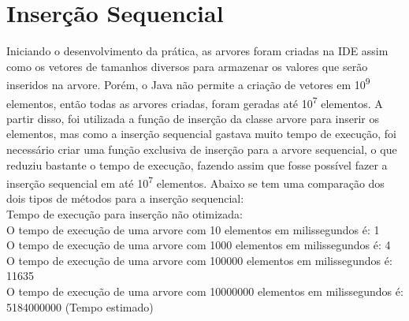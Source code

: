 \label{desenvolvimento}
\section{Inserção Sequencial}
    Iniciando o desenvolvimento da prática, as arvores foram criadas na IDE assim como os vetores de tamanhos diversos para armazenar os valores que serão inseridos na arvore. Porém, o Java não permite a criação de vetores em 10\textsuperscript{9} elementos, então todas as arvores criadas, foram geradas até 10\textsuperscript{7} elementos. A partir disso, foi utilizada a função de inserção da classe arvore para inserir os elementos, mas como a inserção sequencial gastava muito tempo de execução, foi necessário criar uma função exclusiva de inserção para a arvore sequencial, o que reduziu bastante o tempo de execução, fazendo assim que fosse possível fazer a inserção sequencial em até 10\textsuperscript{7} elementos. Abaixo se tem uma comparação dos dois tipos de métodos para a inserção sequencial:\\
    Tempo de execução para inserção não otimizada:\\
    O tempo de execução de uma arvore com 10 elementos em milissegundos é: 1\\
    O tempo de execução de uma arvore com 1000 elementos em milissegundos é: 4\\
    O tempo de execução de uma arvore com 100000 elementos em milissegundos é: 11635\\
    O tempo de execução de uma arvore com 10000000 elementos em milissegundos é: 5184000000 (Tempo estimado)
    
